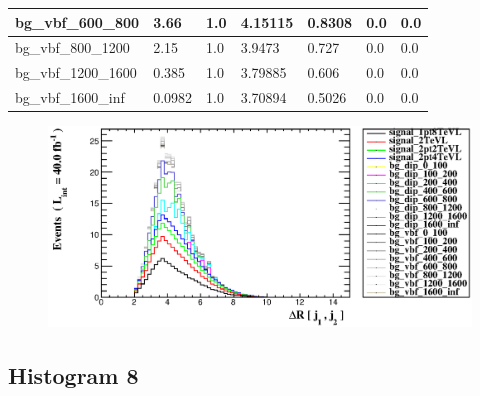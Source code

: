 \documentclass[a4paper, 10pt]{article}
\begin{document}
\begin{table}[H]
\begin{center}
\begin{tabular}{|m{23.0mm}|m{23.0mm}|m{18.0mm}|m{19.0mm}|m{19.0mm}|m{19.0mm}|m{19.0mm}|}
      \hline
      {\cellcolor{white}         bg\_vbf\_600\_800}& {\cellcolor{white}         3.66}& {\cellcolor{white}         1.0}& {\cellcolor{white}         4.15115}& {\cellcolor{white}         0.8308}& {\cellcolor{green}         0.0}& {\cellcolor{green}         0.0}\\
      \hline
      {\cellcolor{white}         bg\_vbf\_800\_1200}& {\cellcolor{white}         2.15}& {\cellcolor{white}         1.0}& {\cellcolor{white}         3.9473}& {\cellcolor{white}         0.727}& {\cellcolor{green}         0.0}& {\cellcolor{green}         0.0}\\
      \hline
      {\cellcolor{white}         bg\_vbf\_1200\_1600}& {\cellcolor{white}         0.385}& {\cellcolor{white}         1.0}& {\cellcolor{white}         3.79885}& {\cellcolor{white}         0.606}& {\cellcolor{green}         0.0}& {\cellcolor{green}         0.0}\\
      \hline
      {\cellcolor{white}         bg\_vbf\_1600\_inf}& {\cellcolor{white}         0.0982}& {\cellcolor{white}         1.0}& {\cellcolor{white}         3.70894}& {\cellcolor{white}         0.5026}& {\cellcolor{green}         0.0}& {\cellcolor{green}         0.0}\\
\hline
    \end{tabular}
  \end{center}
\end{table}

\begin{figure}[H]
  \begin{center}
    \includegraphics[scale=0.45]{selection_6.eps}\\
\caption{   }
  \end{center}
\end{figure}
      \newpage
\subsection{ Histogram 8}
\end{document}
